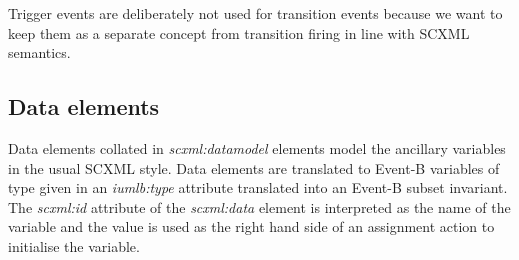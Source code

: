 Trigger events are deliberately not used for transition events because we 
want to keep them as a separate concept from transition firing in line 
with SCXML semantics.

\subsection{Data elements}
Data elements collated in \emph{scxml:datamodel} elements model the ancillary 
variables in the usual SCXML style. Data elements are translated to 
Event-B variables of type given in an \emph{iumlb:type} attribute translated 
into an Event-B subset invariant.  The \emph{scxml:id} attribute of the 
\emph{scxml:data} element is interpreted as the name of the variable and 
the value is used as the right hand side of an assignment action to initialise 
the variable.  


